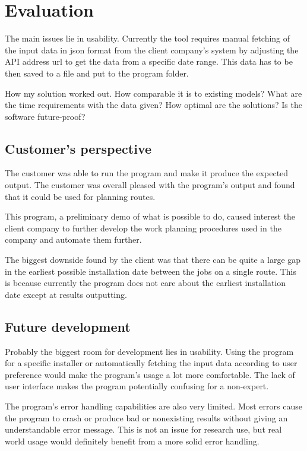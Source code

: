 \chapter{Evaluation}
\label{chapter:evaluation}


The main issues lie in usability. Currently the tool requires manual fetching of the input data in json format from the client company's system by adjusting the API address url to get the data from a specific date range. This data has to be then saved to a file and put to the program folder.

How my solution worked out. How comparable it is to existing models? What are the time requirements with the data given? How optimal are the solutions? Is the software future-proof?


\section{Customer's perspective}

The customer was able to run the program and make it produce the expected output. The customer was overall pleased with the program's output and found that it could be used for planning routes. 

This program, a preliminary demo of what is possible to do, caused interest the client company to further develop the work planning procedures used in the company and automate them further.

The biggest downside found by the client was that there can be quite a large gap in the earliest possible installation date between the jobs on a single route. This is because currently the program does not care about the earliest installation date except at results outputting. 



\section{Future development}

Probably the biggest room for development lies in usability. Using the program for a specific installer or automatically fetching the input data according to user preference would make the program's usage a lot more comfortable. The lack of user interface makes the program potentially confusing for a non-expert.

The program's error handling capabilities are also very limited. Most errors cause the program to crash or produce bad or nonexisting results without giving an understandable error message. This is not an issue for research use, but real world usage would definitely benefit from a more solid error handling.      

